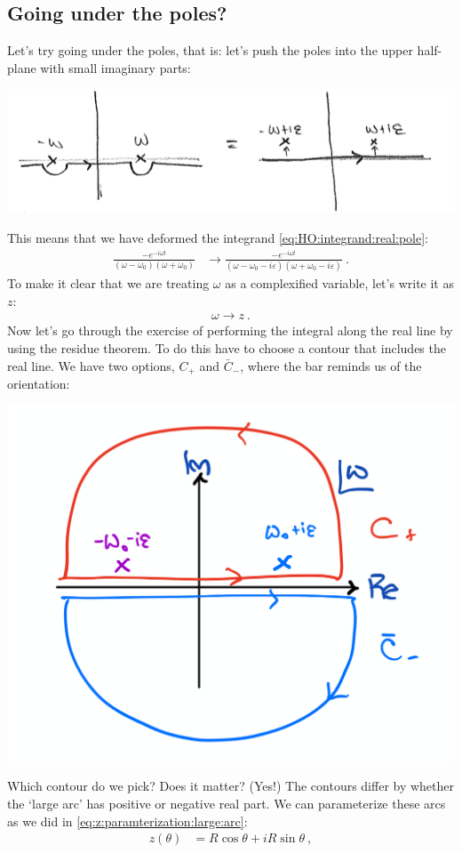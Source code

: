 \subsection{Going under the poles?}
Let's try going under the poles, that is: let's push the poles into the upper half-plane with small imaginary parts:
\begin{center}
\includegraphics[width=.6\textwidth]{figures/Lec_2017_16_underpole.png}
\end{center}
This means that we have deformed the integrand \eqref{eq:HO:integrand:real:pole}:
\begin{align}
\frac{-e^{-i\omega t}}{(\omega - \omega_0)(\omega + \omega_0)}
&\to
\frac{-e^{-i\omega t}}{(\omega - \omega_0 - i\varepsilon)(\omega + \omega_0 - i\varepsilon)} \ .
\label{eq:HO:integrand:upper:poles}
\end{align}
To make it clear that we are treating $\omega$ as a complexified variable, let's write it as $z$:
\begin{align}
 	\omega \to z \ .
 \end{align}
Now let's go through the exercise of performing the integral along the real line by using the residue theorem. To do this have to choose a contour that includes the real line. We have two options, $C_+$ and $\bar C_-$, where the bar reminds us of the orientation:
\begin{center}
\includegraphics[width=.4\textwidth]{figures/Lec_2017_16_pokeup.pdf}
\end{center}
Which contour do we pick? Does it matter? (Yes!) The contours differ by whether the `large arc' has positive or negative real part. We can parameterize these arcs as we did in \eqref{eq:z:paramterization:large:arc}:
\begin{align}
	z(\theta) &= R\cos\theta + i R\sin\theta \ ,
\end{align}
